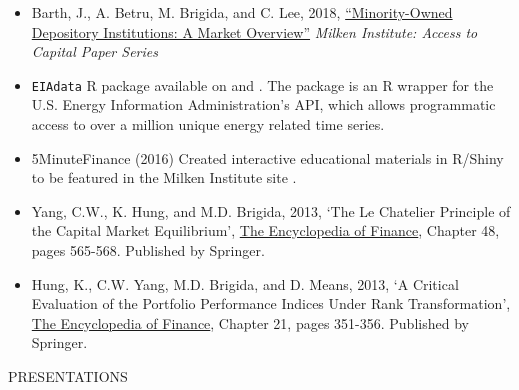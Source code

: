 \documentclass[9pt]{article}
\begin{document}
\begin{itemize}[noitemsep, nolistsep]
\item Barth, J., A. Betru, M. Brigida, and C. Lee, 2018, \href{https://assets1b.milkeninstitute.org/assets/Publication/ResearchReport/PDF/MDIs-A-Market-Overview-7.18.18-FINAL.pdf}{\color{Blue}``Minority-Owned Depository Institutions: A Market Overview''} {\it Milken Institute: Access to Capital Paper Series}
\item \texttt{EIAdata} R package available on \href{http://cran.r-project.org/package=EIAdata}{\color{Blue}{CRAN (stable)}} and \href{https://github.com/Matt-Brigida/EIAdata}{\color{Blue}{Github (development)}}.  The package is an R wrapper for the U.S. Energy Information Administration's API, which allows programmatic access to over a million unique energy related time series.
\item 5MinuteFinance (2016) Created interactive educational materials in R/Shiny to be featured in the Milken Institute site {\color{blue}{5MinuteFinance.org}}. 
\item Yang, C.W., K. Hung, and M.D. Brigida, 2013, `The Le Chatelier Principle of the Capital Market Equilibrium', \underline{The
Encyclopedia of Finance}, Chapter 48, pages 565-568. Published by Springer.
\item Hung, K., C.W. Yang, M.D. Brigida, and D. Means, 2013, `A Critical Evaluation of the Portfolio Performance
Indices Under Rank Transformation', \underline{The Encyclopedia of Finance}, Chapter 21, pages 351-356. Published by
Springer.
\end{itemize}
\vspace{10pt}
PRESENTATIONS
\end{document}
